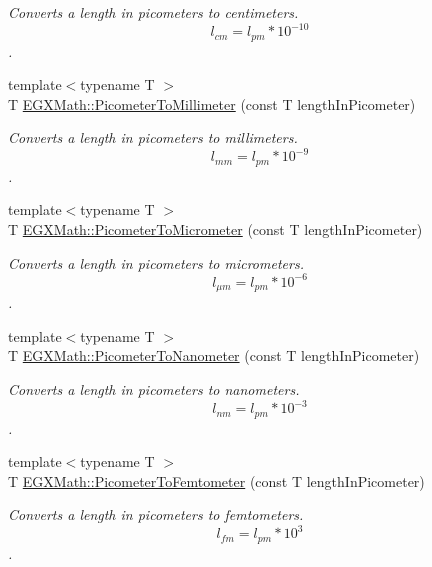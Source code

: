 \begin{DoxyCompactItemize}
\begin{DoxyCompactList}\small\item\em Converts a length in picometers to centimeters. \[ l_{cm}=l_{pm} * 10^{-10} \]. \end{DoxyCompactList}\item 
{\footnotesize template$<$typename T $>$ }\\T \mbox{\hyperlink{group___e_g_x_math-_conversions-_length_conversions-_s_i-_picometer-_s_i_gac6c5e481bf86b5c0d2ed7fa6a06a4c8e}{E\+G\+X\+Math\+::\+Picometer\+To\+Millimeter}} (const T length\+In\+Picometer)
\begin{DoxyCompactList}\small\item\em Converts a length in picometers to millimeters. \[ l_{mm}=l_{pm} * 10^{-9} \]. \end{DoxyCompactList}\item 
{\footnotesize template$<$typename T $>$ }\\T \mbox{\hyperlink{group___e_g_x_math-_conversions-_length_conversions-_s_i-_picometer-_s_i_gacf7ccbf7130894f8a9075cb9fd66c67d}{E\+G\+X\+Math\+::\+Picometer\+To\+Micrometer}} (const T length\+In\+Picometer)
\begin{DoxyCompactList}\small\item\em Converts a length in picometers to micrometers. \[ l_{\mu m}=l_{pm} * 10^{-6} \]. \end{DoxyCompactList}\item 
{\footnotesize template$<$typename T $>$ }\\T \mbox{\hyperlink{group___e_g_x_math-_conversions-_length_conversions-_s_i-_picometer-_s_i_gace426a434c0521d391fd15260e33d9f0}{E\+G\+X\+Math\+::\+Picometer\+To\+Nanometer}} (const T length\+In\+Picometer)
\begin{DoxyCompactList}\small\item\em Converts a length in picometers to nanometers. \[ l_{nm}=l_{pm} * 10^{-3} \]. \end{DoxyCompactList}\item 
{\footnotesize template$<$typename T $>$ }\\T \mbox{\hyperlink{group___e_g_x_math-_conversions-_length_conversions-_s_i-_picometer-_s_i_gabdc7e9ceb6baa9da4cee4b791084fb2a}{E\+G\+X\+Math\+::\+Picometer\+To\+Femtometer}} (const T length\+In\+Picometer)
\begin{DoxyCompactList}\small\item\em Converts a length in picometers to femtometers. \[ l_{fm}=l_{pm} * 10^{3} \]. \end{DoxyCompactList}\item 

\end{DoxyCompactItemize}
